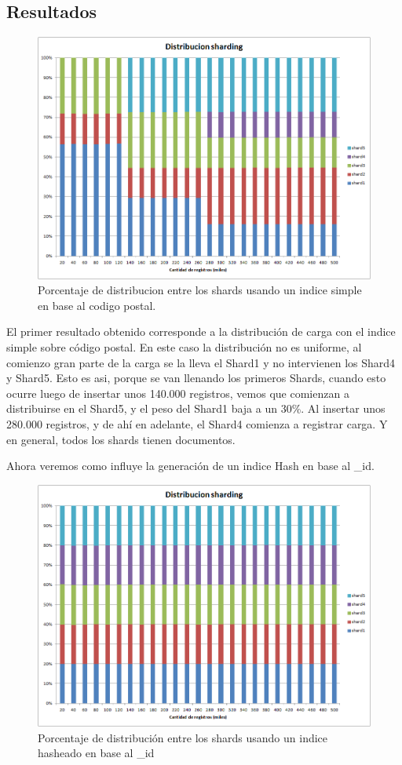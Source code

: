 \subsection{Resultados}
\begin{figure}[H]
\centering
\includegraphics[width=165mm]{../mediciones/sharding_simple.png}
\caption{Porcentaje de distribucion entre los shards usando un
indice simple en base al codigo postal.}
\end{figure}
El primer resultado obtenido corresponde a la distribución de carga con el indice simple sobre código postal. En este caso la distribución no es uniforme, al comienzo gran parte de la carga se la lleva el Shard1 y no intervienen los Shard4 y Shard5. Esto es asi, porque se van llenando los primeros Shards, cuando esto ocurre luego de insertar unos 140.000 registros, vemos que comienzan a distribuirse en el Shard5, y el peso del Shard1 baja a un 30\%.
Al insertar unos 280.000 registros, y de ahí en adelante, el Shard4 comienza a registrar carga. Y en general, todos los shards tienen documentos. 

Ahora veremos como influye la generación de un indice Hash en base al \_id.
\begin{figure}[H]
\centering
\includegraphics[width=165mm]{../mediciones/sharding_hashed.png}
\caption{Porcentaje de distribución entre los shards usando un
indice hasheado en base al \_id}
\end{figure}

